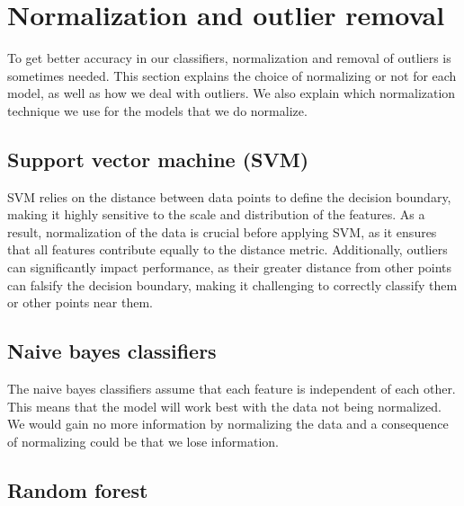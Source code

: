 \section{Normalization and outlier removal}

To get better accuracy in our classifiers, normalization and removal of outliers is sometimes needed. This section explains the choice of normalizing or not for each model, as well as how we deal with outliers. We also explain which normalization technique we use for the models that we do normalize. 

\subsection{Support vector machine (SVM)}
SVM relies on the distance between data points to define the decision boundary, making it highly sensitive to the scale and distribution of the features. As a result, normalization of the data is crucial before applying SVM, as it ensures that all features contribute equally to the distance metric.
Additionally, outliers can significantly impact performance, as their greater distance from other points can falsify the decision boundary, making it challenging to correctly classify them or other points near them.
\subsection{Naive bayes classifiers}

The naive bayes classifiers assume that each feature is independent of each other. This means that the model will work best with the data not being normalized. We would gain no more information by normalizing the data and a consequence of normalizing could be that we lose information.

\subsection{Random forest}